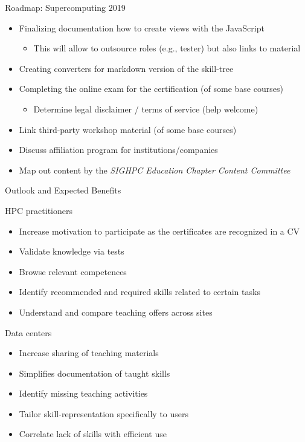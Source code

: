 \documentclass[compress,aspectratio=169]{beamer}
\begin{document}
\begin{frame}{Roadmap: Supercomputing 2019}
		\begin{itemize}
			\item Finalizing documentation how to create views with the JavaScript
        \begin{itemize}
          \item This will allow to outsource roles (e.g., tester) but also links to material
        \end{itemize}
      \item Creating converters for markdown version of the skill-tree
			\item Completing the online exam for the certification (of some base courses)
				\begin{itemize}
					\item Determine legal disclaimer / terms of service (help welcome)
				\end{itemize}
      \item Link third-party workshop material (of some base courses)
			\item Discuss affiliation program for institutions/companies
			\item Map out content by the \textit{SIGHPC Education Chapter Content Committee}
		\end{itemize}
  \label{frame:last}
\end{frame}


\begin{frame}{Outlook and Expected Benefits}
	\begin{block}{HPC practitioners}
		\vspace*{-0.2cm}
	\begin{itemize}
	\item Increase motivation to participate as the certificates are recognized in a CV
	\item Validate knowledge via tests
	\item Browse relevant competences
	\item Identify recommended and required skills related to certain tasks
	\item Understand and compare teaching offers across sites
	\end{itemize}
	\end{block}
	\vspace*{-0.3cm}
	\begin{block}{Data centers}
		\vspace*{-0.2cm}
	\begin{itemize}
	\item Increase sharing of teaching materials
	\item Simplifies documentation of taught skills
	\item Identify missing teaching activities
	\item Tailor skill-representation specifically to users
	\item Correlate lack of skills with efficient use
	\end{itemize}
	\end{block}
\end{frame}
\end{document}
